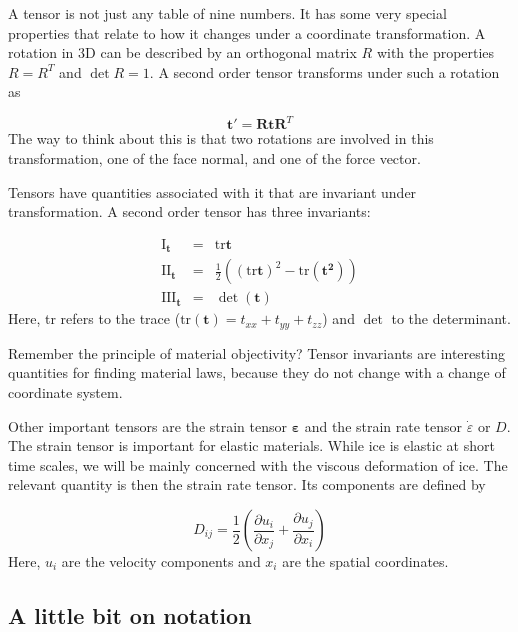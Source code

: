 \documentclass[12pt, openany]{memoir}
\newcommand{\pder}[2]{\ensuremath{\frac{\partial #1}{\partial #2}}}
\newcommand{\eps}{\dot{\varepsilon}}
\begin{document}
A tensor is not just any table of nine numbers. It has some very
special properties that relate to how it changes under a coordinate
transformation. A rotation in 3D can be described by an orthogonal
matrix $R$ with the properties $R=R^T$ and $\det R =1$. A second order
tensor transforms under such a rotation as

\begin{equation}
\mathbf{t'} = \mathbf{R t R}^T
\end{equation}
The way to think about this is that two rotations are involved in this
transformation, one of the face normal, and one of the force vector.

Tensors have quantities associated with it that are invariant under
transformation. A second order tensor has three invariants:

\begin{eqnarray}
\mathrm{I}_\mathbf{t} &=& \mathrm{tr} \mathbf{t} \\
\mathrm{II}_\mathbf{t} &=& \frac{1}{2} \left( (\mathrm{tr}\mathbf{t})^2
- \mathrm{tr}( \mathbf{t^2}) \right) \\
\mathrm{III}_\mathbf{t} &=& \det (\mathbf{t})
\end{eqnarray}
Here, tr refers to the trace ($\mathrm{tr} (\mathbf{t}) =
t_{xx}+t_{yy}+t_{zz}$) and $\det$ to the determinant.

Remember the principle of material objectivity? Tensor invariants are
interesting quantities for finding material laws, because they do not
change with a change of coordinate system.

Other important tensors are the strain tensor $\mathbf{\varepsilon}$
and the strain rate tensor $\eps$ or $D$. The strain tensor is important for
elastic materials. While ice is elastic at short time scales, we will
be mainly concerned with the viscous deformation of ice. The relevant
quantity is then the strain rate tensor. Its components are defined by

\begin{equation}
D_{ij} = \frac{1}{2}\left(\pder{u_i}{x_j} + \pder{u_j}{x_i} \right)
\end{equation}
Here, $u_i$ are the velocity components and $x_i$ are the spatial
coordinates.

\subsection{A little bit on notation}
\end{document}
